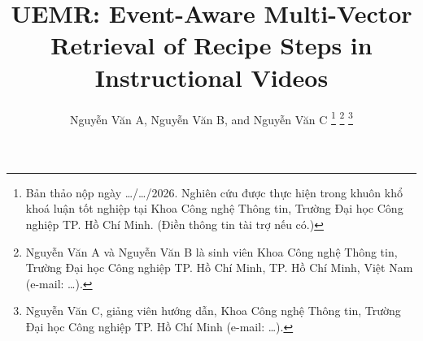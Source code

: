 \documentclass{IEEEtran}
\begin{document}
\title{UEMR: Event-Aware Multi-Vector Retrieval of Recipe Steps in Instructional Videos}
\author{Nguyễn Văn A, Nguyễn Văn B, and Nguyễn Văn C
\thanks{Bản thảo nộp ngày \ldots/\ldots/2026. Nghiên cứu được thực hiện trong khuôn khổ khoá luận tốt nghiệp tại Khoa Công nghệ Thông tin, Trường Đại học Công nghiệp TP. Hồ Chí Minh. (Điền thông tin tài trợ nếu có.)}
\thanks{Nguyễn Văn A và Nguyễn Văn B là sinh viên Khoa Công nghệ Thông tin, Trường Đại học Công nghiệp TP. Hồ Chí Minh, TP. Hồ Chí Minh, Việt Nam (e-mail: \ldots).}
\thanks{Nguyễn Văn C, giảng viên hướng dẫn, Khoa Công nghệ Thông tin, Trường Đại học Công nghiệp TP. Hồ Chí Minh (e-mail: \ldots).}}

\maketitle
\end{document}
